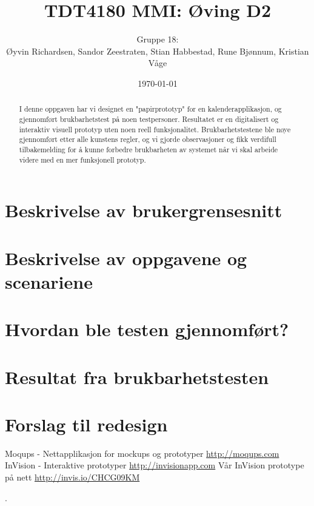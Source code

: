 \documentclass[a4paper,11pt]{article}
\title{TDT4180 MMI: Øving D2}
\author{Gruppe 18: \\ Øyvin Richardsen, Sandor Zeestraten, Stian Habbestad, Rune Bjønnum, Kristian Våge}
\date{\today}
\begin{document}
\maketitle

\begin{abstract}
I denne oppgaven har vi designet en "papirprototyp" for en kalenderapplikasjon, og gjennomført brukbarhetstest på noen testpersoner. Resultatet er en digitalisert og interaktiv visuell prototyp uten noen reell funksjonalitet. Brukbarhetstestene ble nøye gjennomført etter alle kunstens regler, og vi gjorde observasjoner og fikk verdifull tilbakemelding for å kunne forbedre brukbarheten av systemet når vi skal arbeide videre med en mer funksjonell prototyp.
\end{abstract}

\medskip
\tableofcontents

\newpage

\section{Beskrivelse av brukergrensesnitt}


\section{Beskrivelse av oppgavene og scenariene}


\section{Hvordan ble testen gjennomført?}


\section{Resultat fra brukbarhetstesten}


\section{Forslag til redesign}


\footnotesize{  %
\begin{thebibliography}{N}
 Moqups - Nettapplikasjon for mockups og prototyper \url{http://moqups.com}
 InVision - Interaktive prototyper \url{http://invisionapp.com}
 Vår InVision prototype på nett \url{http://invis.io/CHCG09KM}

\end{thebibliography}.  
}

\newpage


\end{document}
